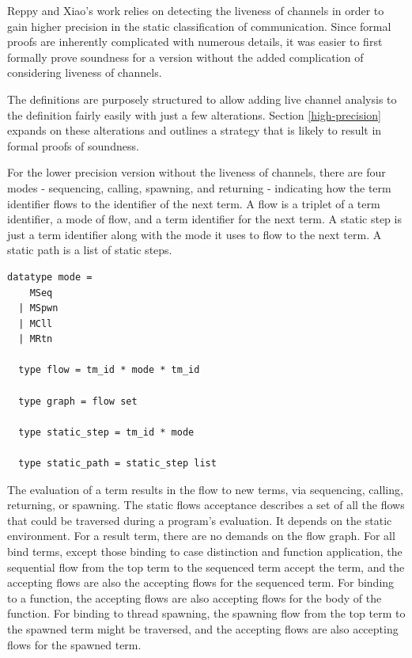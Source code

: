 \documentclass[letterpaper, 11pt]{report}
\begin{document}
Reppy and Xiao's work relies on detecting the liveness of channels in order to gain higher
precision in the static classification of communication. Since formal proofs are inherently
complicated with numerous details, it was easier to first formally prove soundness for a
version without the added complication of considering liveness of channels.

The definitions are purposely structured to allow adding live channel analysis to the
definition fairly easily with just a few alterations. Section \ref{high-precision} expands on
these alterations and outlines a strategy that is likely to result in formal proofs of
soundness.

For the lower precision version without the liveness of channels, there are four modes -
sequencing, calling, spawning, and returning -
indicating how the term identifier flows to the identifier of the next term.
A flow is a triplet of a term identifier, a mode of flow, and a term identifier for the next term.
A static step is just a term identifier along with the mode it uses to
flow to the next term. A static path is a list of static steps. 

\begin{lstlisting}[language=logic, mathescape]
  datatype mode =
    MSeq
  | MSpwn
  | MCll
  | MRtn

  type flow = tm_id * mode * tm_id

  type graph = flow set

  type static_step = tm_id * mode

  type static_path = static_step list
\end{lstlisting}

The evaluation of a term results in the flow to new terms,
via sequencing, calling, returning, or spawning.
The static flows acceptance describes a set of all the flows
that could be traversed during a program's evaluation.
It depends on the static environment.
For a result term, there are no demands on the flow graph. For all bind terms, except those binding
to case distinction and function application, the sequential flow from the top term to
the sequenced term accept the term, and the accepting flows are also the
accepting flows for the sequenced term. For binding to a function, the
accepting flows are also accepting flows for the body of the function.
For binding to thread spawning, the spawning flow from the top term
to the spawned term might be traversed, and the accepting flows are also
accepting flows for the spawned term.
\end{document}
